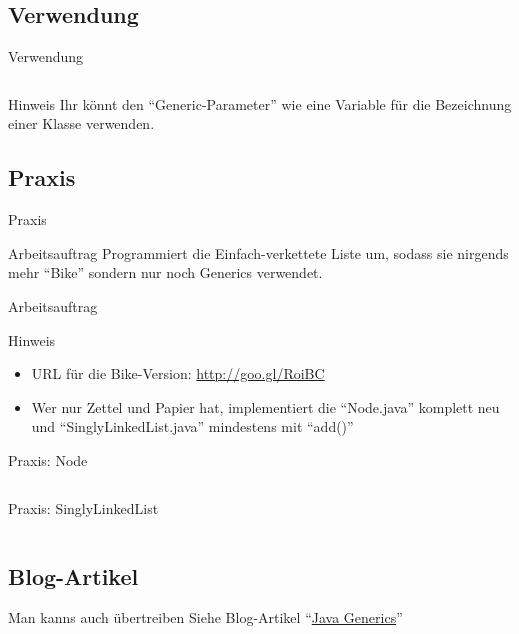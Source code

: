 \documentclass[usepdftitle=false,hyperref={pdfpagelabels=false}]{beamer}
\begin{document}
\subsection{Verwendung}
\begin{frame}{Verwendung}
    \inputminted[linenos=true, numbersep=5pt, tabsize=4, fontsize=\small]{java}{Generics-singleLines.java}
    \begin{block}{Hinweis}
        Ihr könnt den "`Generic-Parameter"' wie eine Variable für die
        Bezeichnung einer Klasse verwenden.
    \end{block}
\end{frame}

\subsection{Praxis}
\begin{frame}{Praxis}
    \begin{block}{Arbeitsauftrag}
        Programmiert die Einfach-verkettete Liste um, sodass sie 
        nirgends mehr "`Bike"' sondern nur noch Generics verwendet.
    \end{block}{Arbeitsauftrag}

    \begin{exampleblock}{Hinweis}
        \begin{itemize}
          \item URL für die Bike-Version: \href{http://goo.gl/RoiBC}{http://goo.gl/RoiBC}
          \item Wer nur Zettel und Papier hat, implementiert die "`Node.java"' 
                komplett neu und "`SinglyLinkedList.java"' mindestens mit "`add()"'
        \end{itemize}
    \end{exampleblock}
\end{frame}

\begin{frame}{Praxis: Node}
    \inputminted[linenos=true, numbersep=5pt, tabsize=4, fontsize=\tiny]{java}{SinglyLinkedList-Result/Node.java}
\end{frame}

\begin{frame}{Praxis: SinglyLinkedList}
    \inputminted[linenos=true, numbersep=5pt, tabsize=4, fontsize=\small, firstnumber=1, firstline=1, lastline=13]{java}{SinglyLinkedList-Result/SinglyLinkedList.java}
\end{frame}

\subsection{Blog-Artikel}
\begin{frame}{Man kanns auch übertreiben}
    Siehe Blog-Artikel "`\href{http://martin-thoma.com/java-generics/}{Java Generics}"'
\end{frame}
\end{document}
